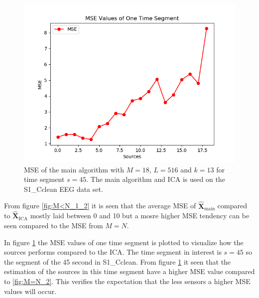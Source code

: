 \begin{figure}[H]
\centering
\includegraphics[scale=0.5]{figures/ch_7/MSE_3M_N.png}
	\caption{MSE of the main algorithm with $M=18$, $L = 516$ and $k=13$ for time segment $s=45$. The main algorithm and ICA is used on the S1\_Cclean EEG data set.}
\label{fig:M<N_2}
\end{figure}
\noindent
From figure \ref{fig:M<N_1_2} it is seen that the average MSE of $\hat{\mathbf{X}}_{\text{main}}$ compared to $\hat{\mathbf{X}}_{\text{ICA}}$ mostly laid between 0 and 10 but a mosre higher MSE tendency can be seen compared to the MSE from $M=N$. 

In figure \ref{fig:M<N_2} the MSE values of one time segment is plotted to visualize how the sources performs compared to the ICA. The time segment in interest is $s = 45$ so the segment of the 45 second in S1\_Cclean. 
From figure \ref{fig:M<N_2} it seen that the estimation of the sources in this time segment have a higher MSE value compared to \ref{fig:M=N_2}. This verifies the expectation that the less sensors a higher MSE values will occur.

